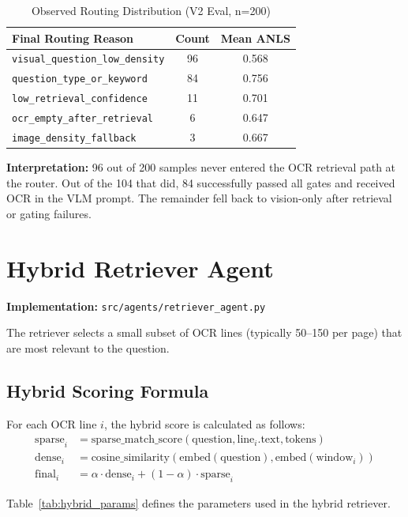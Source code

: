 \documentclass[11pt,a4paper]{article}
\begin{document}
\begin{table}[H]
\centering
\caption{Observed Routing Distribution (V2 Eval, n=200)}
\label{tab:routing_dist}
\begin{tabular}{|l|c|c|}
\hline
\textbf{Final Routing Reason} & \textbf{Count} & \textbf{Mean ANLS} \\ \hline
\texttt{visual\_question\_low\_density} & 96 & 0.568 \\ \hline
\texttt{question\_type\_or\_keyword} & 84 & 0.756 \\ \hline
\texttt{low\_retrieval\_confidence} & 11 & 0.701 \\ \hline
\texttt{ocr\_empty\_after\_retrieval} & 6 & 0.647 \\ \hline
\texttt{image\_density\_fallback} & 3 & 0.667 \\ \hline
\end{tabular}
\end{table}

\textbf{Interpretation:} 96 out of 200 samples never entered the OCR retrieval path at the router. Out of the 104 that did, 84 successfully passed all gates and received OCR in the VLM prompt. The remainder fell back to vision-only after retrieval or gating failures.

\newpage
\section{Hybrid Retriever Agent}
\textbf{Implementation:} \texttt{src/agents/retriever\_agent.py}

The retriever selects a small subset of OCR lines (typically 50--150 per page) that are most relevant to the question.

\subsection{Hybrid Scoring Formula}
For each OCR line $i$, the hybrid score is calculated as follows:
\begin{align}
\text{sparse}_i &= \text{sparse\_match\_score}(\text{question}, \text{line}_i.\text{text}, \text{tokens}) \\
\text{dense}_i  &= \text{cosine\_similarity}(\text{embed}(\text{question}), \text{embed}(\text{window}_i)) \\
\text{final}_i  &= \alpha \cdot \text{dense}_i + (1 - \alpha) \cdot \text{sparse}_i
\end{align}

Table~\ref{tab:hybrid_params} defines the parameters used in the hybrid retriever.
\end{document}
